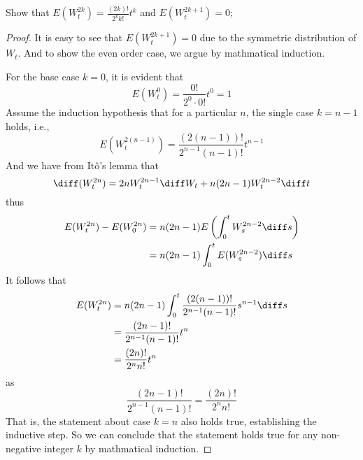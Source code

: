     \problem
    \begin{question}
        Show that $E(W_t^{2k})=\frac{(2k)!}{2^kk!}t^k$ and $E(W_t^{2k+1})=0$;
    \end{question}
    \begin{proof}
        It is easy to see that $E(W_t^{2k+1})=0$ due to the symmetric distribution
        of $W_t$. And to show the even order case, we argue by mathmatical induction.

        For the base case $k=0$, it is evident that
        \[E(W_t^0)=\frac{0!}{2^0\cdot 0!}t^0=1\]
        Assume the induction hypothesis that for a particular $n$, the
        single case $k=n-1$ holds, i.e.,
        \[E(W_t^{2(n-1)})=\frac{(2(n-1))!}{2^{n-1}(n-1)!}t^{n-1}\]
        And we have from It\^o's lemma that
        \[\diff (W_t^{2n})=2nW_t^{2n-1}\diff W_t+n(2n-1)W_t^{2n-2}\diff t\]
        thus
        \[\begin{aligned}
            E(W_t^{2n})-E(W_0^{2n})&=n(2n-1)E\left(\int_0^tW_s^{2n-2}\diff s\right)\\
            &=n(2n-1)\int_0^tE(W_s^{2n-2})\diff s
        \end{aligned}\]
        It follows that
        \[\begin{aligned}
            E(W_t^{2n})&=n(2n-1)\int_0^t\frac{(2(n-1))!}{2^{n-1}(n-1)!}s^{n-1}\diff s\\
            &=\frac{(2n-1)!}{2^{n-1}(n-1)!}t^n\\
            &=\frac{(2n)!}{2^nn!}t^n
        \end{aligned}\]
        as
        \[\frac{(2n-1)!}{2^{n-1}(n-1)!}=\frac{(2n)!}{2^nn!}\]
        That is, the statement about case $k=n$ also holds true, establishing
        the inductive step.
        So we can conclude that the statement holds true for any non-negative integer $k$
        by mathmatical induction.

    \end{proof}

